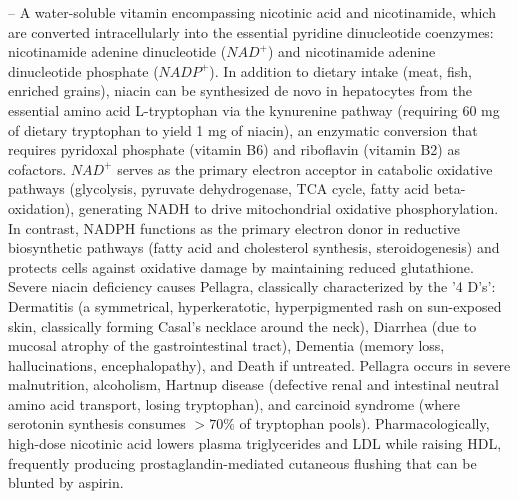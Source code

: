 -- A water-soluble vitamin encompassing nicotinic acid and nicotinamide, which are converted intracellularly into the essential pyridine dinucleotide coenzymes: nicotinamide adenine dinucleotide ($NAD^+$) and nicotinamide adenine dinucleotide phosphate ($NADP^+$). In addition to dietary intake (meat, fish, enriched grains), niacin can be synthesized de novo in hepatocytes from the essential amino acid L-tryptophan via the kynurenine pathway (requiring 60 mg of dietary tryptophan to yield 1 mg of niacin), an enzymatic conversion that requires pyridoxal phosphate (vitamin B6) and riboflavin (vitamin B2) as cofactors. $NAD^+$ serves as the primary electron acceptor in catabolic oxidative pathways (glycolysis, pyruvate dehydrogenase, TCA cycle, fatty acid beta-oxidation), generating NADH to drive mitochondrial oxidative phosphorylation. In contrast, NADPH functions as the primary electron donor in reductive biosynthetic pathways (fatty acid and cholesterol synthesis, steroidogenesis) and protects cells against oxidative damage by maintaining reduced glutathione. Severe niacin deficiency causes Pellagra, classically characterized by the '4 D's': Dermatitis (a symmetrical, hyperkeratotic, hyperpigmented rash on sun-exposed skin, classically forming Casal's necklace around the neck), Diarrhea (due to mucosal atrophy of the gastrointestinal tract), Dementia (memory loss, hallucinations, encephalopathy), and Death if untreated. Pellagra occurs in severe malnutrition, alcoholism, Hartnup disease (defective renal and intestinal neutral amino acid transport, losing tryptophan), and carcinoid syndrome (where serotonin synthesis consumes $>70\%$ of tryptophan pools). Pharmacologically, high-dose nicotinic acid lowers plasma triglycerides and LDL while raising HDL, frequently producing prostaglandin-mediated cutaneous flushing that can be blunted by aspirin.


